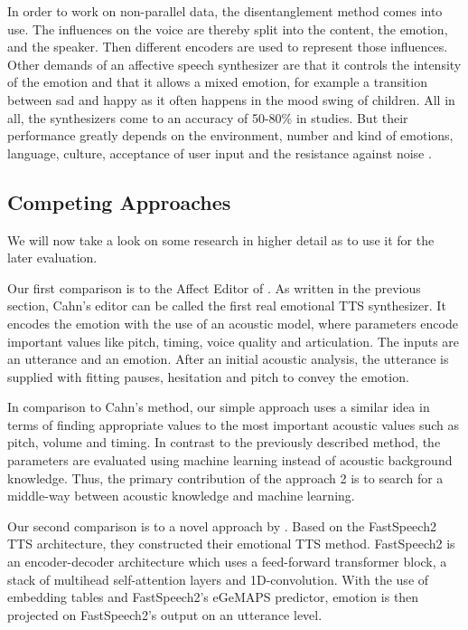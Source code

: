 \documentclass[11pt]{article}
\begin{document}
In order to work on non-parallel data, the disentanglement method comes into use. The influences on the voice are thereby split into the content, the emotion, and the speaker. Then different encoders are used to represent those influences.
Other demands of an affective speech synthesizer are that it controls the intensity of the emotion and that it allows a mixed emotion, for example a transition between sad and happy as it often happens in the mood swing of children. All in all, the synthesizers come to an accuracy of 50-80\% in studies. But their performance greatly depends on the environment, number and kind of emotions, language, culture, acceptance of user input and the resistance against noise \cite{triantafyllopoulos_overview_2023}.


\subsection{Competing Approaches}
\label{competing_approaches}
We will now take a look on some research in higher detail as to use it for the later evaluation. 

Our first comparison is to the Affect Editor of \cite{cahn_generation_2000}. As written in the previous section, Cahn's editor can be called the first real emotional TTS synthesizer. It encodes the emotion with the use of an acoustic model, where parameters encode important values like pitch, timing, voice quality and articulation. The inputs are an utterance and an emotion. After an initial acoustic analysis, the utterance is supplied with fitting pauses, hesitation and pitch to convey the emotion.

In comparison to Cahn's method, our simple approach uses a similar idea in terms of finding appropriate values to the most important acoustic values such as pitch, volume and timing. In contrast to the previously described method, the parameters are evaluated using machine learning instead of acoustic background knowledge. Thus, the primary contribution of the approach 2 is to search for a middle-way between acoustic knowledge and machine learning.

Our second comparison is to a novel approach by \cite{diatlova_emospeech_2023}. Based on the FastSpeech2 TTS architecture, they constructed their emotional TTS method. FastSpeech2 is an encoder-decoder architecture which uses a feed-forward transformer block, a stack of multihead self-attention layers and 1D-convolution. With the use of embedding tables and FastSpeech2's eGeMAPS predictor, emotion is then projected on FastSpeech2's output on an utterance level.
\\
\end{document}
